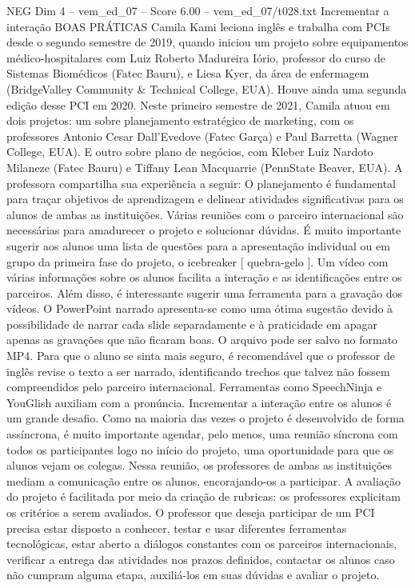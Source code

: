 \begin{textsample}{NEG Dim 4 – vem\_ed\_07 – Score 6.00 – vem\_ed\_07/t028.txt}  \label{ex:f4_neg_129}
Incrementar a interação BOAS PRÁTICAS Camila Kami leciona inglês e trabalha com PCIs desde o segundo semestre de 2019, quando iniciou um projeto sobre equipamentos médico-hospitalares com Luiz Roberto Madureira Iório, professor do curso de Sistemas Biomédicos (Fatec Bauru), e Liesa Kyer, da área de enfermagem (BridgeValley Community \& Technical College, EUA).
Houve ainda uma segunda edição desse PCI em 2020.
Neste primeiro semestre de 2021, Camila atuou em dois projetos: um sobre planejamento estratégico de marketing, com os professores Antonio Cesar Dall’Evedove (Fatec Garça) e Paul Barretta (Wagner College, EUA).
E outro sobre plano de negócios, com Kleber Luiz Nardoto Milaneze (Fatec Bauru) e Tiffany Lean Macquarrie (PennState Beaver, EUA).
A professora compartilha sua experiência a seguir: O planejamento é fundamental para traçar objetivos de aprendizagem e delinear atividades significativas para os alunos de ambas as instituições.
Várias reuniões com o parceiro internacional são necessárias para amadurecer o projeto e solucionar dúvidas.
É muito importante sugerir aos alunos uma lista de questões para a apresentação individual ou em grupo da primeira fase do projeto, o icebreaker [ quebra-gelo ].
Um vídeo com várias informações sobre os alunos facilita a interação e as identificações entre os parceiros.
Além disso, é interessante sugerir uma ferramenta para a gravação dos vídeos.
O PowerPoint narrado apresenta-se como uma ótima sugestão devido à possibilidade de narrar cada slide separadamente e à praticidade em apagar apenas as gravações que não ficaram boas.
O arquivo pode ser salvo no formato MP4.
Para que o aluno se sinta mais seguro, é recomendável que o professor de inglês revise o texto a ser narrado, identificando trechos que talvez não fossem compreendidos pelo parceiro internacional.
Ferramentas como SpeechNinja e YouGlish auxiliam com a pronúncia.
Incrementar a interação entre os alunos é um grande desafio.
Como na maioria das vezes o projeto é desenvolvido de forma assíncrona, é muito importante agendar, pelo menos, uma reunião síncrona com todos os participantes logo no início do projeto, uma oportunidade para que os alunos vejam os colegas.
Nessa reunião, os professores de ambas as instituições mediam a comunicação entre os alunos, encorajando-os a participar.
A avaliação do projeto é facilitada por meio da criação de rubricas: os professores explicitam os critérios a serem avaliados.
O professor que deseja participar de um PCI precisa estar disposto a conhecer, testar e usar diferentes ferramentas tecnológicas, estar aberto a diálogos constantes com os parceiros internacionais, verificar a entrega das atividades nos prazos definidos, contactar os alunos caso não cumpram alguma etapa, auxiliá-los em suas dúvidas e avaliar o projeto.

\end{textsample}
